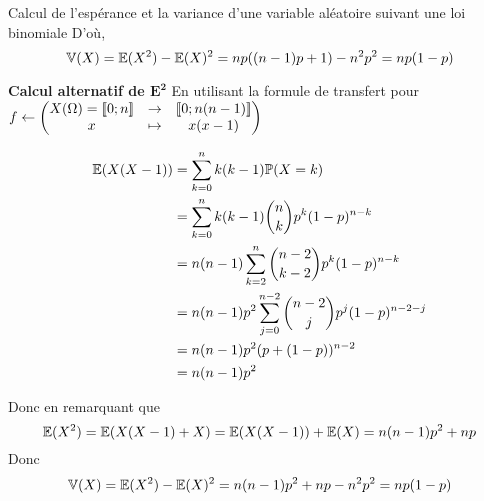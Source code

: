 \documentclass{article}
\begin{document}
\begin{question_kholle}{Calcul de l'espérance et la variance d'une variable aléatoire suivant une loi binomiale}
	D'où,
	$$
	\mathbb V(X) = \mathbb E(X^{2}) - \mathbb E(X)^{2}=np((n-1)p+1)- n^{2} p ^{2}=np(1-p)
	$$
	
	\noindent \textbf{Calcul alternatif de $\mathbf{E^2}$} En utilisant la formule de transfert pour $f \leftarrow \left( \begin{matrix}
		X(\Omega) = [\![ 0; n ]\!] &\to &[\![ 0; n(n-1) ]\!] \\
		x &\mapsto &x(x-1)
	\end{matrix} \right)$
	
	
	\begin{align*}
		\mathbb E(X(X - 1)) &= \sum_{k=0}^{n}k(k-1)\mathbb P(X=k) \\
		&= \sum_{k=0}^{n}k(k-1)\binom{n}{k}p^{k}(1-p)^{n-k} \\
		&= n(n-1) \sum_{k=2}^{n}\binom{n-2}{k-2}p^{k}(1-p)^{n-k} \\
		&= n(n-1)p^{2} \sum_{j=0}^{n-2} \binom{n-2}{j}p^{j}(1-p)^{n-2-j} \\
		&= n(n-1) p^{2} (p + (1-p))^{n-2} \\
		&= n(n-1)p^{2}
	\end{align*}
	
	Donc en remarquant que $$\mathbb E(X^{2}) = \mathbb E(X(X-1)+X) = \mathbb E(X(X-1))+\mathbb E(X)= n(n-1)p^{2} + np$$
	Donc
	$$\mathbb V(X) = \mathbb E(X^{2})- \mathbb E(X)^{2} = n(n-1)p^{2} + np - n^{2}p^{2} = np(1-p)$$
	
	
\end{question_kholle}
\end{document}
